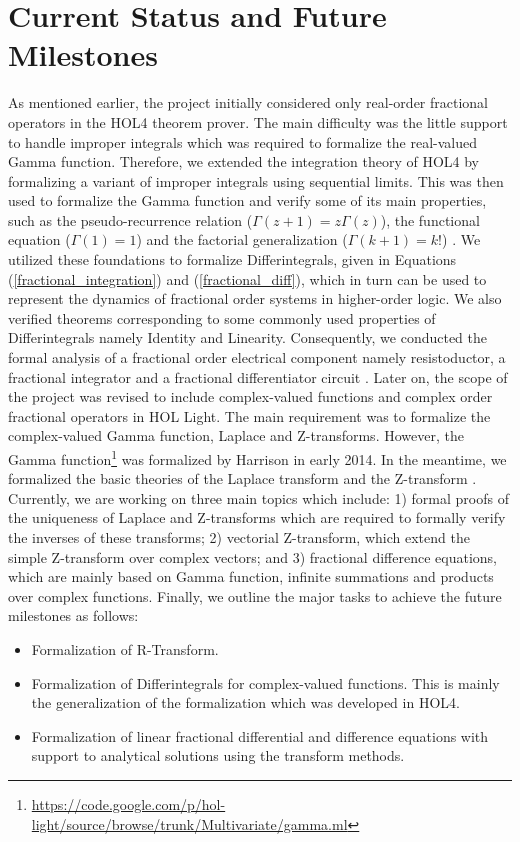 \documentclass {llncs}
\begin{document}
\section{Current Status and Future Milestones} \label{sec:formalization}
As mentioned earlier, the project initially considered only real-order fractional operators in the HOL4 theorem prover.
The main difficulty was the little  support to handle improper integrals which was required to formalize the
real-valued Gamma function. Therefore, we extended the  integration theory of HOL4 by formalizing a variant of
improper integrals using sequential limits. This was then used to formalize the
Gamma function and verify some of its
main properties, such as the pseudo-recurrence relation ($\Gamma(z+1)=z\Gamma(z)$), the functional equation ($\Gamma(1)=1$) and the factorial generalization ($\Gamma(k+1)=k!$) \cite{Umair_Gamma}.
We utilized these foundations to
formalize  Differintegrals, given in Equations (\ref{fractional_integration}) and (\ref{fractional_diff}),
which in turn can be used to represent the dynamics of fractional order systems in higher-order logic.
We also verified theorems corresponding to some commonly used properties of  Differintegrals namely
Identity and Linearity. Consequently, we conducted the formal analysis of a
 fractional order electrical component namely  resistoductor, a fractional integrator and a fractional differentiator circuit \cite{Umair_FMCAD_11}. Later on, the scope of the project was revised to include
complex-valued  functions and complex order fractional operators in HOL Light. The main requirement was to formalize the
complex-valued Gamma function, Laplace and Z-transforms.
However, the Gamma function\footnote{{\url{https://code.google.com/p/hol-light/source/browse/trunk/Multivariate/gamma.ml}}}
was formalized by Harrison in early 2014. In the meantime, we formalized the basic theories of the Laplace transform \cite {laplace_lpar}
and the Z-transform \cite{umair_itp_z}. Currently, we are working on three main topics which include: 1) formal proofs of the
uniqueness of Laplace and Z-transforms which are required to formally verify the inverses of these transforms; 2) vectorial Z-transform,
which extend the simple Z-transform over complex vectors; and 3) fractional difference equations, which are mainly based
on Gamma function, infinite summations and products over complex functions.
Finally, we outline the major tasks to  achieve the future milestones as follows:
\begin{itemize}
                        \item Formalization of R-Transform.
                        \item Formalization of Differintegrals for complex-valued functions. This is mainly the generalization of the formalization which was developed in HOL4.
                        \item Formalization of linear fractional differential and difference equations with support to analytical
                        solutions using the transform methods.
                      \end{itemize}
\end{document}
